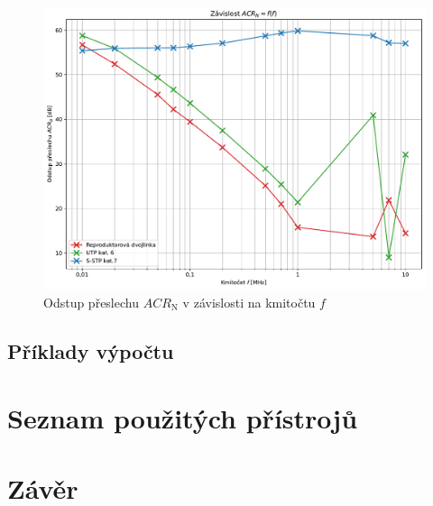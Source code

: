 \documentclass[a4paper, czech]{article}
\begin{document}
\begin{figure}[H]
    \centering
    \includegraphics[width=\textwidth]{grafy/graf3.pdf}
    \caption{Odstup přeslechu $ACR_\text{N}$ v závislosti na kmitočtu $f$}
\end{figure}

\subsection{Příklady výpočtu}

\section{Seznam použitých přístrojů}

\section{Závěr}
\end{document}
